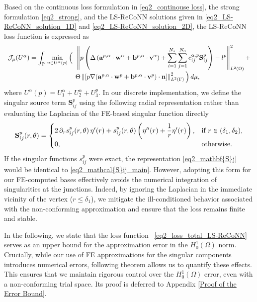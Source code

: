 \documentclass[oneside]{article}
\begin{document}
\noindent Based on the continuous loss formulation in \eqref{eq2_continouse loss}, the strong formulation \eqref{eq2_strong}, and the LS-ReCoNN solutions given in \eqref{eq2_LS-ReCoNN_solution_1D} and \eqref{eq2_LS-ReCoNN_solution_2D}, the LS-ReCoNN loss function is expressed as
\begin{equation}\label{eq2_loss_total_LS-ReCoNN}
\begin{array}{rl}
{\mathcal{J}}_\mu(U^{\alpha})= \displaystyle \int_\mathbb{P} \,\min_{u \in U^{\alpha}(p)}\Big( & \hspace{-2mm}\displaystyle \,\left\Vert p \left( \Delta \left(\mathbf{a}^{p, \alpha}\cdot\mathbf{w}^{\alpha} + \mathbf{b}^{p, \alpha}\cdot\mathbf{v}^{\alpha}\right) + \sum _{i=1}^{N_s}\sum _{j=1}^{N_3} {c_{ij}^{\alpha, p}} \mathbf{S}_{ij}^{p} \right) - l^p \right\Vert^2_{L^2(\Omega)} + \\
&\hspace{-2mm}\Theta \left\Vert [p \nabla (\mathbf{a}^{p, \alpha}\cdot \mathbf{w}^{p} + \mathbf{b}^{p, \alpha}\cdot \mathbf{v}^{p}) \cdot \mathbf{n}] \right\Vert_{L^2(\Gamma)}^2 
\Big)\,d\mu,
\end{array}   
\end{equation}
where $U^{\alpha}(p) = U_1^\alpha + U_2^\alpha + U_3^p$. In our discrete implementation, we define the singular source term $\mathbf{S}_{ij}^{p}$ using the following radial representation rather than evaluating the Laplacian of the FE-based singular function directly
\begin{equation}\label{eq2_mathbf{S}j}
\mathbf{S}_{ij}^{p}(r, \theta) =
\begin{cases}
2\, \partial_r s^p_{ij}(r, \theta)\, \eta'(r) + s^p_{ij}(r, \theta)\left( \eta''(r) + \dfrac{1}{r} \eta'(r) \right), & \text{if } r \in (\delta_1, \delta_2), \\
0, & \text{otherwise}.
\end{cases}
\end{equation}
If the singular functions $s_{ij}^p$ were exact, the representation \eqref{eq2_mathbf{S}j} would be identical to \eqref{eq2_mathcal{S}ij_main}. However, adopting this form for our FE-computed bases effectively avoids the numerical integration of singularities at the junctions. Indeed, by ignoring the Laplacian in the immediate vicinity of the vertex ($r \leq \delta_1$), we mitigate the ill-conditioned behavior associated with the non-conforming approximation and ensure that the loss remains finite and stable.


\noindent In the following, we state that the loss function ~\eqref{eq2_loss_total_LS-ReCoNN} serves as an upper bound for the approximation error in the \(H_0^1(\Omega)\) norm. Crucially, while our use of FE approximations for the singular components introduces numerical errors, following theorem allows us to quantify these effects. This ensures that we maintain rigorous control over the $H_0^1(\Omega)$ error, even with a non-conforming trial space. Its proof is deferred to
Appendix \ref{Proof of the Error Bound}.
\end{document}
